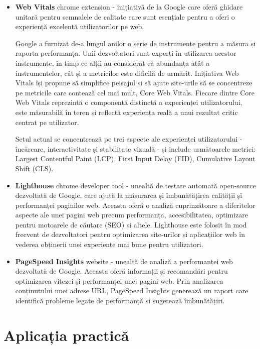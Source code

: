 \documentclass[12pt, a4paper]{report}
\begin{document}
\begin{itemize}
	\item  \textbf{Web Vitals} chrome extension - inițiativă de la Google care oferă ghidare unitară pentru semnalele de calitate care sunt esențiale pentru a oferi o experiență excelentă utilizatorilor pe web.

	      Google a furnizat de-a lungul anilor o serie de instrumente pentru a măsura și raporta performanța. Unii dezvoltatori sunt experți în utilizarea acestor instrumente, în timp ce alții au considerat că abundanța atât a instrumentelor, cât și a metricilor este dificilă de urmărit.  Inițiativa Web Vitals își propune să simplifice peisajul și să ajute site-urile să se concentreze pe metricile care contează cel mai mult, Core Web Vitals. Fiecare dintre Core Web Vitals reprezintă o componentă distinctă a experienței utilizatorului, este măsurabilă în teren și reflectă experiența reală a unui rezultat critic centrat pe utilizator.

	      Setul actual se concentrează pe trei aspecte ale experienței utilizatorului - încărcare, interactivitate și stabilitate vizuală - și include următoarele metrici: Largest Contentful Paint (LCP), First Input Delay (FID), Cumulative Layout Shift (CLS).

	\item \textbf{Lighthouse} chrome developer tool - unealtă de testare automată open-source dezvoltată de Google, care ajută la măsurarea și îmbunătățirea calității și performanței paginilor web. Aceasta oferă o analiză cuprinzătoare a diferitelor aspecte ale unei pagini web precum performanța, accesibilitatea, optimizare pentru motoarele de căutare (SEO) și altele. Lighthouse este folosit în mod frecvent de dezvoltatori pentru optimizarea site-urilor și aplicațiilor web în vederea obținerii unei experiențe mai bune pentru utilizatori.

	\item \textbf{PageSpeed Insights} website - unealtă de analiză a performanței web dezvoltată de Google. Aceasta oferă informații și recomandări pentru optimizarea vitezei și performanței unei pagini web. Prin analizarea conținutului unei adrese URL, PageSpeed Insights generează un raport care identifică probleme legate de performanță și sugerează îmbunătățiri.
\end{itemize}

\section{Aplicația practică}
\end{document}
